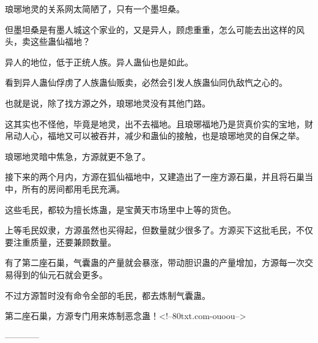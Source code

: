 \begin{this_body}
琅琊地灵的关系网太简陋了，只有一个墨坦桑。

但墨坦桑是有墨人城这个家业的，又是异人，顾虑重重，怎么可能去出这样的风头，卖这些蛊仙福地？

异人的地位，低于正统人族。异人蛊仙也是如此。

看到异人蛊仙俘虏了人族蛊仙贩卖，必然会引发人族蛊仙同仇敌忾之心的。

也就是说，除了找方源之外，琅琊地灵没有其他门路。

这其实也不怪他，毕竟是地灵，出不去福地。且琅琊福地乃是货真价实的宝地，财帛动人心，福地又可以被吞并，减少和蛊仙的接触，也是琅琊地灵的自保之举。

琅琊地灵暗中焦急，方源就更不急了。

接下来的两个月内，方源在狐仙福地中，又建造出了一座方源石巢，并且将石巢当中，所有的房间都用毛民充满。

这些毛民，都较为擅长炼蛊，是宝黄天市场里中上等的货色。

上等毛民奴隶，方源虽然也买得起，但数量就少很多了。方源买下这批毛民，不仅要注重质量，还要兼顾数量。

有了第二座石巢，气囊蛊的产量就会暴涨，带动胆识蛊的产量增加，方源每一次交易得到的仙元石就会更多。

不过方源暂时没有命令全部的毛民，都去炼制气囊蛊。

第二座石巢，方源专门用来炼制恶念蛊！<!--80txt.com-ouoou-->

------------

\end{this_body}


